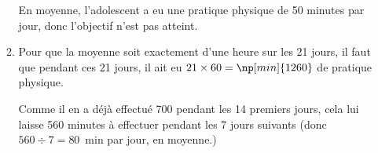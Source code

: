 \begin{enumerate}
\begin{enumerate}
		En moyenne, l'adolescent a eu une pratique physique de 50 minutes par jour, donc l'objectif n'est pas atteint.


		\item Pour que la moyenne soit exactement d'une heure sur les 21 jours, il faut que pendant ces 21 jours, il ait eu $21 \times 60 = \np[min]{1260}$ de pratique physique.

		Comme il en a déjà effectué 700 pendant les 14 premiers jours, cela lui laisse 560 minutes à effectuer pendant les 7 jours suivants (donc $560\div 7 = 80$~min par jour, en moyenne.)
	\end{enumerate}
\end{enumerate}

\bigskip

